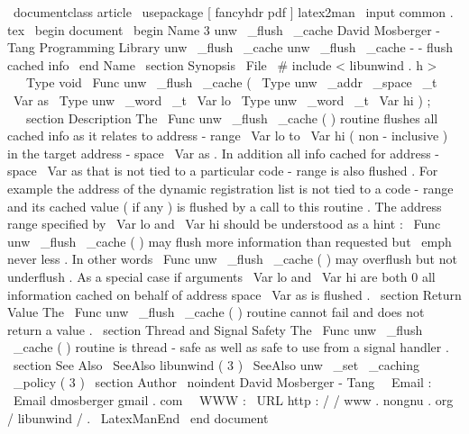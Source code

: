 \
documentclass
{
article
}
\
usepackage
[
fancyhdr
pdf
]
{
latex2man
}
\
input
{
common
.
tex
}
\
begin
{
document
}
\
begin
{
Name
}
{
3
}
{
unw
\
_flush
\
_cache
}
{
David
Mosberger
-
Tang
}
{
Programming
Library
}
{
unw
\
_flush
\
_cache
}
unw
\
_flush
\
_cache
-
-
flush
cached
info
\
end
{
Name
}
\
section
{
Synopsis
}
\
File
{
\
#
include
<
libunwind
.
h
>
}
\
\
\
Type
{
void
}
\
Func
{
unw
\
_flush
\
_cache
}
(
\
Type
{
unw
\
_addr
\
_space
\
_t
}
\
Var
{
as
}
\
Type
{
unw
\
_word
\
_t
}
\
Var
{
lo
}
\
Type
{
unw
\
_word
\
_t
}
\
Var
{
hi
}
)
;
\
\
\
section
{
Description
}
The
\
Func
{
unw
\
_flush
\
_cache
}
(
)
routine
flushes
all
cached
info
as
it
relates
to
address
-
range
\
Var
{
lo
}
to
\
Var
{
hi
}
(
non
-
inclusive
)
in
the
target
address
-
space
\
Var
{
as
}
.
In
addition
all
info
cached
for
address
-
space
\
Var
{
as
}
that
is
not
tied
to
a
particular
code
-
range
is
also
flushed
.
For
example
the
address
of
the
dynamic
registration
list
is
not
tied
to
a
code
-
range
and
its
cached
value
(
if
any
)
is
flushed
by
a
call
to
this
routine
.
The
address
range
specified
by
\
Var
{
lo
}
and
\
Var
{
hi
}
should
be
understood
as
a
hint
:
\
Func
{
unw
\
_flush
\
_cache
}
(
)
may
flush
more
information
than
requested
but
\
emph
{
never
}
less
.
In
other
words
\
Func
{
unw
\
_flush
\
_cache
}
(
)
may
overflush
but
not
underflush
.
As
a
special
case
if
arguments
\
Var
{
lo
}
and
\
Var
{
hi
}
are
both
0
all
information
cached
on
behalf
of
address
space
\
Var
{
as
}
is
flushed
.
\
section
{
Return
Value
}
The
\
Func
{
unw
\
_flush
\
_cache
}
(
)
routine
cannot
fail
and
does
not
return
a
value
.
\
section
{
Thread
and
Signal
Safety
}
The
\
Func
{
unw
\
_flush
\
_cache
}
(
)
routine
is
thread
-
safe
as
well
as
safe
to
use
from
a
signal
handler
.
\
section
{
See
Also
}
\
SeeAlso
{
libunwind
(
3
)
}
\
SeeAlso
{
unw
\
_set
\
_caching
\
_policy
(
3
)
}
\
section
{
Author
}
\
noindent
David
Mosberger
-
Tang
\
\
Email
:
\
Email
{
dmosberger
gmail
.
com
}
\
\
WWW
:
\
URL
{
http
:
/
/
www
.
nongnu
.
org
/
libunwind
/
}
.
\
LatexManEnd
\
end
{
document
}
